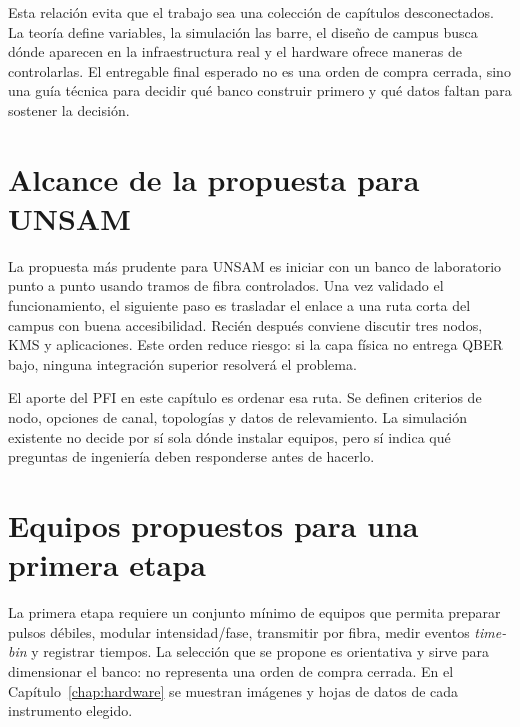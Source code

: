 Esta relación evita que el trabajo sea una colección de capítulos desconectados. La teoría define variables, la simulación las barre, el diseño de campus busca dónde aparecen en la infraestructura real y el hardware ofrece maneras de controlarlas. El entregable final esperado no es una orden de compra cerrada, sino una guía técnica para decidir qué banco construir primero y qué datos faltan para sostener la decisión.

\section{Alcance de la propuesta para UNSAM}

La propuesta más prudente para UNSAM es iniciar con un banco de laboratorio punto a punto usando tramos de fibra controlados. Una vez validado el funcionamiento, el siguiente paso es trasladar el enlace a una ruta corta del campus con buena accesibilidad. Recién después conviene discutir tres nodos, KMS y aplicaciones. Este orden reduce riesgo: si la capa física no entrega QBER bajo, ninguna integración superior resolverá el problema.

El aporte del PFI en este capítulo es ordenar esa ruta. Se definen criterios de nodo, opciones de canal, topologías y datos de relevamiento. La simulación existente no decide por sí sola dónde instalar equipos, pero sí indica qué preguntas de ingeniería deben responderse antes de hacerlo.

\section{Equipos propuestos para una primera etapa}

La primera etapa requiere un conjunto mínimo de equipos que permita preparar pulsos débiles, modular intensidad/fase, transmitir por fibra, medir eventos \textit{time-bin} y registrar tiempos. La selección que se propone es orientativa y sirve para dimensionar el banco: no representa una orden de compra cerrada. En el Capítulo~\ref{chap:hardware} se muestran imágenes y hojas de datos de cada instrumento elegido.

